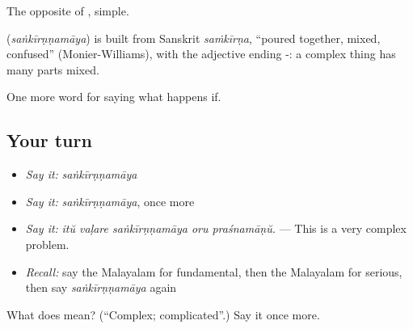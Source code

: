 The opposite of , simple.

\begin{cousinweb}
\textbf{} (\emph{saṅkīrṇṇamāya}) is built from Sanskrit \emph{saṁkīrṇa}, \textquotedblleft{}poured together, mixed, confused\textquotedblright{} (Monier-Williams), with the adjective ending -: a complex thing has many parts mixed.
\end{cousinweb}

\begin{grammarlens}[title={What you've built}]
One more word for saying what happens if.
\end{grammarlens}

\subsection*{Your turn}
\begin{itemize}
\raggedright
  \item \emph{Say it:} \emph{saṅkīrṇṇamāya}
  \item \emph{Say it:} \emph{saṅkīrṇṇamāya}, once more
  \item \emph{Say it:} \emph{itŭ vaḷare saṅkīrṇṇamāya oru praśnamāṇŭ.} — This is a very complex problem.
  \item \emph{Recall:} say the Malayalam for fundamental, then the Malayalam for serious, then say \emph{saṅkīrṇṇamāya} again
\end{itemize}

\begin{tcolorbox}[breakable,colback=teal!4,colframe=teal!35!black,title={Before you move on}]
What does  mean? (\textquotedblleft{}Complex; complicated\textquotedblright{}.) Say it once more.
\end{tcolorbox}
